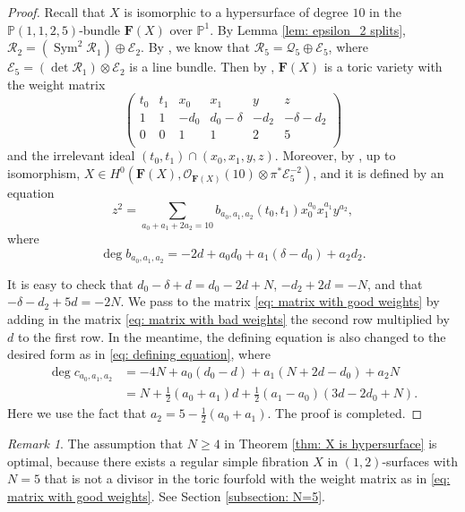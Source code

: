 \documentclass[a4paper,11pt]{amsart}
\newcommand{\PP}{\ensuremath{\mathbb{P}}}
\DeclareMathOperator{\Sym}{Sym}
\theoremstyle{definition}
\theoremstyle{remark}
\newtheorem{remark}[thm]{Remark}
\numberwithin{equation}{section}
\begin{document}
\begin{proof}
	Recall that $X$ is isomorphic to a hypersurface of degree $10$ in the $\PP(1, 1, 2, 5)$-bundle $\mathbf{F}(X)$ over $\PP^1$. By Lemma \ref{lem: epsilon_2 splits}, $\mathcal{R}_2 = (\Sym^2 \mathcal{R}_1) \oplus \mathcal{E}_2$. By \cite[Proposition 4.14 and Corollary 4.16]{CP}, we know that $\mathcal{R}_5 = \mathcal{Q}_5 \oplus \mathcal{E}_5$, where $\mathcal{E}_5 = (\det \mathcal{R}_1) \otimes \mathcal{E}_2$ is a line bundle. Then by \cite[Example 3.16]{CP}, $\mathbf{F}(X)$ is a toric variety with the weight matrix
	\begin{equation}\label{eq: matrix with bad weights}
		\begin{pmatrix}
			t_0 & t_1 & x_0 & x_1 & y & z \\
			1 & 1 & -d_0 & d_0 - \delta & -d_2 & -\delta - d_2 \\
			0 & 0 & 1 & 1 & 2 & 5\\
		\end{pmatrix}
	\end{equation}
	and the irrelevant ideal $(t_0,t_1) \cap (x_0,x_1,y,z)$. Moreover, by \cite[Corollary 4.15]{CP}, up to isomorphism, $X \in H^0 \left(\mathbf{F}(X), \mathcal{O}_{\mathbf{F}(X)}(10) \otimes \pi^*\mathcal{E}_5^{-2}\right)$, and it is defined by an equation
	$$
	z^2 = \sum_{a_0 + a_1 + 2a_2 = 10} b_{a_0, a_1, a_2}(t_0, t_1) x_0^{a_0} x_1^{a_1} y^{a_2},
	$$
	where 
	$$
	\deg b_{a_0, a_1, a_2} = -2d + a_0d_0 + a_1(\delta - d_0) + a_2d_2.
	$$
	
	It is easy to check that $d_0 - \delta + d = d_0 - 2d + N$, $-d_2 + 2d = -N$, and that $-\delta - d_2 + 5d = -2N$. We pass to the matrix \eqref{eq: matrix with good weights} by adding in the matrix \eqref{eq: matrix with bad weights} the second row multiplied by $d$ to the first row. In the meantime, the defining equation is also changed to the desired form as in \eqref{eq: defining equation}, where
	\begin{align*}
		\deg c_{a_0,a_1,a_2} & = -4N + a_0(d_0 - d) + a_1(N + 2d - d_0) + a_2 N \\
		& = N + \frac12 (a_0 + a_1) d + \frac 12 (a_1-a_0) (3d - 2d_0 + N).
	\end{align*}
	Here we use the fact that $a_2 = 5 - \frac{1}{2}(a_0 + a_1)$. The proof is completed.
\end{proof}

\begin{remark}
	The assumption that $N \ge 4$ in Theorem \ref{thm: X is hypersurface} is optimal, because there exists a regular simple fibration $X$ in $(1, 2)$-surfaces with $N = 5$ that is not a divisor in the toric fourfold with the weight matrix as in \eqref{eq: matrix with good weights}. See Section \ref{subsection: N=5}.
\end{remark}
\end{document}
